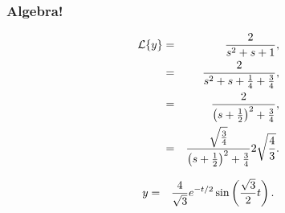 \begin{frame}
  \frametitle{Algebra!}

  \begin{eqnarray*}
    \laplace{y} & = & \frac{2}{s^2+s+1}, \\
    & = & \frac{2}{s^2+s+\frac{1}{4} + \frac{3}{4}}, \\
    & = & \frac{2}{\lp s + \half \rp^2 + \frac{3}{4}}, \\
    & = & \frac{\sqrt{\frac{3}{4}}}{\lp s + \half \rp^2 + \frac{3}{4}} 2 \sqrt{\frac{4}{3}}.
  \end{eqnarray*}

  {
    \begin{eqnarray*}
      y & = & \frac{4}{\sqrt{3}} e^{-t/2}\sin\left(\frac{\sqrt{3}}{2} t\right).
    \end{eqnarray*}
  }

\end{frame}



